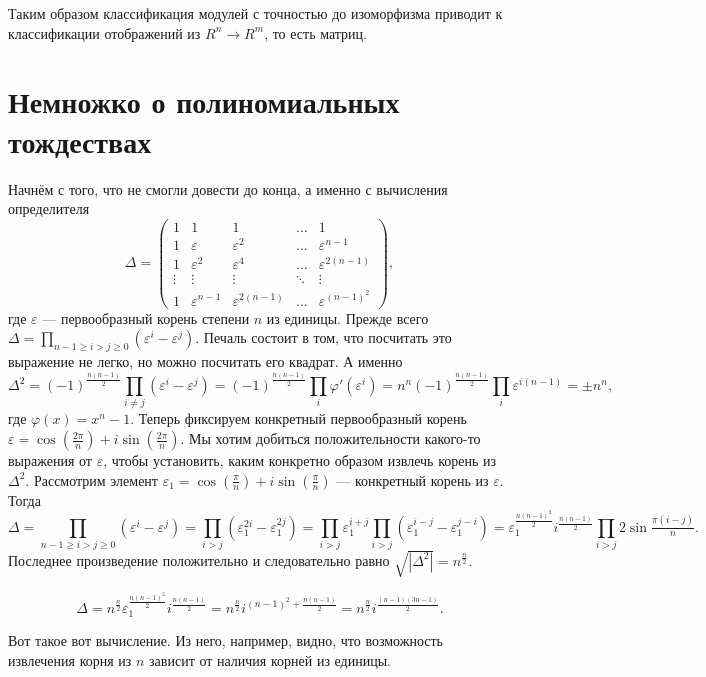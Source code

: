 \documentclass[10pt,a4paper,oneside]{book}
\theoremstyle{definition}
\def\eps{\varepsilon}
\begin{document}
Таким образом классификация модулей с точностью до изоморфизма приводит к классификации отображений из $R^n\to R^m$, то есть матриц.




\section{Немножко о полиномиальных тождествах}

Начнём с того, что не смогли довести до конца, а именно с вычисления определителя
 $$\Delta =\left(\begin{matrix} 
1 & 1 & 1 & \dots & 1\\
1 & \eps  & \eps^2 & \dots&  \eps^{n-1}\\
1 & \eps^2 & \eps^4 & \dots & \eps^{2(n-1)}\\
\vdots & \vdots  &  \vdots   & \ddots   & \vdots \\
1 & \eps^{n-1} & \eps^{2(n-1)} & \dots  & \eps^{(n-1)^2}
\end{matrix}\right),$$
где $\eps$ --- первообразный корень степени $n$ из единицы.
Прежде всего $\Delta= \prod_{n-1\geq i> j\geq 0}(\eps^i-\eps^j)$. Печаль состоит в том, что посчитать это выражение не легко, но можно посчитать его квадрат. А именно
$$\Delta^2=(-1)^{\tfrac{n(n-1)}{2}}\prod_{i\neq j}(\eps^i-\eps^j)= (-1)^{\tfrac{n(n-1)}{2}} \prod_{i} \varphi'(\eps^i)=n^n (-1)^{\tfrac{n(n-1)}{2}}\prod_{i} \eps^{i(n-1)}=\pm n^n,$$
где $\varphi(x)=x^n-1$.
Теперь фиксируем конкретный первообразный корень $\eps=\cos(\tfrac{2\pi}{n})+i\sin(\tfrac{2\pi}{n})$. Мы хотим добиться положительности какого-то выражения от $\eps$, чтобы установить, каким конкретно образом извлечь корень из $\Delta^2$. Рассмотрим элемент $\eps_1=\cos(\tfrac{\pi}{n})+i\sin(\tfrac{\pi}{n})$ --- конкретный корень из $\eps$. Тогда
$$\Delta= \prod_{n-1\geq i> j\geq 0}(\eps^i-\eps^j)= \prod_{i> j}(\eps_1^{2i}-\eps_1^{2j})=\prod_{i>j}\eps_1^{i+j}\prod_{i> j}(\eps_1^{i-j}-\eps_1^{j-i})=\eps_1^{\tfrac{n(n-1)^2}{2}} i^{\tfrac{n(n-1)}{2}}\prod_{i> j}2\sin \tfrac{\pi(i-j)}{n}.$$
Последнее произведение положительно и следовательно равно $\sqrt{|\Delta^2|}=n^{\tfrac{n}{2}}$.

$$\Delta=n^{\tfrac{n}{2}}\eps_1^{\tfrac{n(n-1)^2}{2}} i^{\tfrac{n(n-1)}{2}}=n^{\tfrac{n}{2}} i^{(n-1)^2+\tfrac{n(n-1)}{2}}=n^{\tfrac{n}{2}} i^{\tfrac{(n-1)(3n-1)}{2}}.$$

Вот такое вот вычисление. Из него, например, видно, что возможность извлечения корня из $n$  зависит от наличия корней из единицы.
\end{document}
